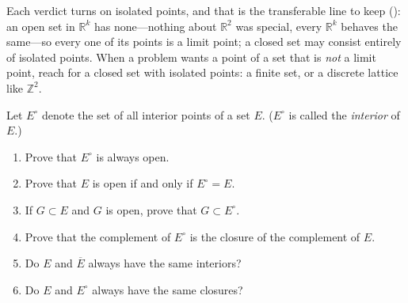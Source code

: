 \documentclass[main.tex]{subfiles}
\begin{document}
\begin{Reflection}
Each verdict turns on isolated points, and that is the transferable line to keep (): an
open set in $\mathbb R^{k}$ has none---nothing about $\mathbb R^{2}$ was special, every $\mathbb R^{k}$
behaves the same---so every one of its points is a limit point; a closed set may consist entirely of
isolated points. When a problem wants a point of a set that is \emph{not} a limit point, reach for a
closed set with isolated points: a finite set, or a discrete lattice like $\mathbb Z^{2}$.
\end{Reflection}

Let $E^{\circ}$ denote the set of all interior points of a set $E$. ($E^{\circ}$ is called the
\emph{interior} of $E$.)
\begin{enumerate}[leftmargin=1.7em,itemsep=2pt,topsep=2pt,label=\textnormal{(\alph*)}]
  \item Prove that $E^{\circ}$ is always open.
  \item Prove that $E$ is open if and only if $E^{\circ}=E$.
  \item If $G\subset E$ and $G$ is open, prove that $G\subset E^{\circ}$.
  \item Prove that the complement of $E^{\circ}$ is the closure of the complement of $E$.
  \item Do $E$ and $\overline{E}$ always have the same interiors?
  \item Do $E$ and $E^{\circ}$ always have the same closures?
\end{enumerate}
\end{document}
